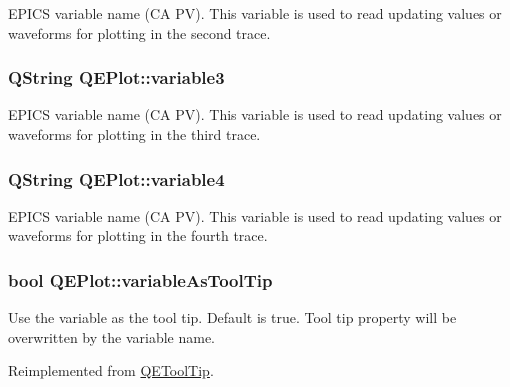 \label{classQEPlot_aee6877cd682d63bfbf61575560a70390}
EPICS variable name (CA PV). This variable is used to read updating values or waveforms for plotting in the second trace. \hypertarget{classQEPlot_a9bfab2a67bfeb7701da6df980b200124}{
\subsubsection[{variable3}]{\setlength{\rightskip}{0pt plus 5cm}QString QEPlot::variable3}}
\label{classQEPlot_a9bfab2a67bfeb7701da6df980b200124}
EPICS variable name (CA PV). This variable is used to read updating values or waveforms for plotting in the third trace. \hypertarget{classQEPlot_a34e75617d0de188f7a1dd4c701b4616e}{
\subsubsection[{variable4}]{\setlength{\rightskip}{0pt plus 5cm}QString QEPlot::variable4}}
\label{classQEPlot_a34e75617d0de188f7a1dd4c701b4616e}
EPICS variable name (CA PV). This variable is used to read updating values or waveforms for plotting in the fourth trace. \hypertarget{classQEPlot_a01d27c6da28b8e719ebfc48400fabbfa}{
\subsubsection[{variableAsToolTip}]{\setlength{\rightskip}{0pt plus 5cm}bool QEPlot::variableAsToolTip}}
\label{classQEPlot_a01d27c6da28b8e719ebfc48400fabbfa}
Use the variable as the tool tip. Default is true. Tool tip property will be overwritten by the variable name. 

Reimplemented from \hyperlink{classQEToolTip}{QEToolTip}.

